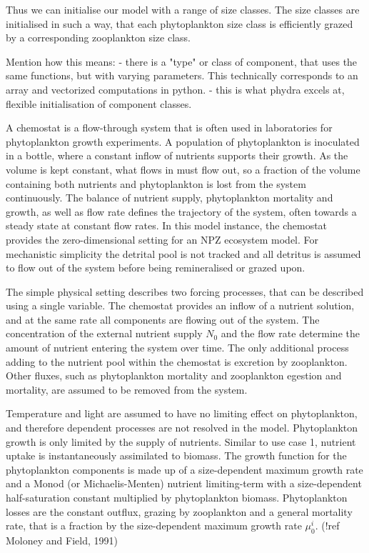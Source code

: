 \documentclass[template.tex]{subfiles}
\begin{document}
Thus we can initialise our model with a range of size classes. The size classes are initialised in such a way, that each phytoplankton size class is efficiently grazed by a corresponding zooplankton size class.

Mention how this means:
- there is a "type" or class of component, that uses the same functions, but with varying parameters. This technically corresponds to an array and vectorized computations in python.
- this is what phydra excels at, flexible initialisation of component classes.

A chemostat is a flow-through system that is often used in laboratories for phytoplankton growth experiments. A population of phytoplankton is inoculated in a bottle, where a constant inflow of nutrients supports their growth. As the volume is kept constant, what flows in must flow out, so a fraction of the volume containing both nutrients and phytoplankton is lost from the system continuously. The balance of nutrient supply, phytoplankton mortality and growth, as well as flow rate defines the trajectory of the system, often towards a steady state at constant flow rates. 
In this model instance, the chemostat provides the zero-dimensional setting for an NPZ ecosystem model. For mechanistic simplicity the detrital pool is not tracked and all detritus is assumed to flow out of the system before being remineralised or grazed upon.

The simple physical setting describes two forcing processes, that can be described using a single variable. The chemostat provides an inflow of a nutrient solution, and at the same rate all components are flowing out of the system. The concentration of the external nutrient supply $N_0$ and the flow rate determine the amount of nutrient entering the system over time. The only additional process adding to the nutrient pool within the chemostat is excretion by zooplankton. Other fluxes, such as phytoplankton mortality and zooplankton egestion and mortality, are assumed to be removed from the system.

Temperature and light are assumed to have no limiting effect on phytoplankton, and therefore dependent processes are not resolved in the model. Phytoplankton growth is only limited by the supply of nutrients. Similar to use case 1, nutrient uptake is instantaneously assimilated to biomass. The growth function for the phytoplankton components is made up of a size-dependent maximum growth rate and a Monod (or Michaelis-Menten) nutrient limiting-term with a size-dependent half-saturation constant multiplied by phytoplankton biomass. 
Phytoplankton losses are the constant outflux, grazing by zooplankton and a general mortality rate, that is a fraction by the size-dependent maximum growth rate $\mu^i_0$. (!ref Moloney and Field, 1991)
\end{document}

